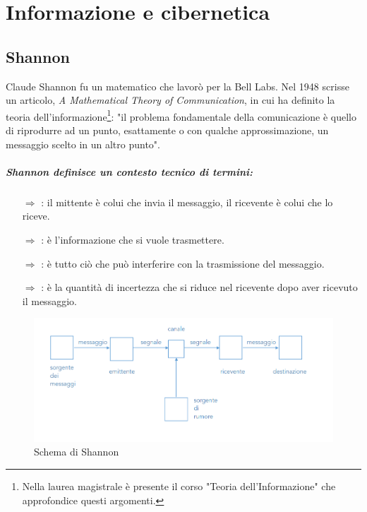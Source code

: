 \chapter{Informazione e cibernetica}

\section{Shannon}

Claude Shannon fu un matematico che lavorò per la Bell Labs.  Nel 1948 scrisse un articolo,
\textit{A Mathematical Theory of Communication}, in cui ha definito la teoria dell'informazione\footnote{Nella laurea magistrale è presente il corso "Teoria dell'Informazione" che approfondice questi argomenti.}: 
"il problema fondamentale della comunicazione è quello di 
riprodurre ad un punto, esattamente o con qualche approssimazione, un messaggio
scelto in un altro punto".

\paragraph{Shannon definisce un contesto tecnico di termini:}
\begin{itemize}
    \item [$\Rightarrow$] : il mittente è colui che invia il messaggio, il ricevente è colui che lo riceve.
    \item [$\Rightarrow$] : è l'informazione che si vuole trasmettere.
    \item [$\Rightarrow$] : è tutto ciò che può interferire con la trasmissione del messaggio.
    \item [$\Rightarrow$] : è la quantità di incertezza che si riduce nel ricevente dopo aver ricevuto il messaggio.
\end{itemize}



\begin{figure}[h]
    \centering
    \includegraphics[scale=0.35]{images/Shannon.png}
    \caption{Schema di Shannon}
\end{figure}

